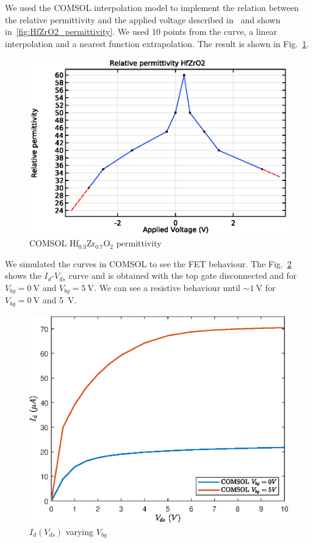 \documentclass[electronics,article,submit,moreauthors,pdftex]{Definitions/mdpi}
\begin{document}
We used the COMSOL interpolation model to implement the relation between the relative permittivity and the applied voltage described in~\cite{Dragoman:ferroelectric} and shown in~\ref{fig:HfZrO2_permittivity}. We used 10 points from the curve, a linear interpolation and a nearest function extrapolation. The result is shown in Fig.~\ref{fig:permittivity_HfZrO2}.

\begin{figure}[h]
	\centering
	\includegraphics[width=.7\textwidth]{Grafici/permittivity_HfZrO2.eps} 
	\caption{COMSOL Hf$_{0.3}$Zr$_{0.7}$O$_2$ permittivity}
	\label{fig:permittivity_HfZrO2}
\end{figure}

We simulated the curves in COMSOL to see the FET behaviour. The Fig.~\ref{fig:HfZrO2_Id(Vd)_varying_Vbg} shows the $I_d$-$V_{ds}$ curve and is obtained with the top gate disconnected and for $V_{bg} = \SI{0}{\volt}$ and $V_{bg} = \SI{5}{\volt}$. We can see a resistive behaviour until $\sim \SI{1}{\volt}$ for $V_{bg} = \SI{0}{\volt}$ and \SI{5}{\volt}.
\begin{figure}[h]
	\centering
	\includegraphics[width=.8\textwidth]{Grafici/HfZrO2_Id(Vd)_varying_Vbg.eps} 
	\caption{$I_d(V_{ds})$ varying $V_{bg}$}
	\label{fig:HfZrO2_Id(Vd)_varying_Vbg}
\end{figure} 
\end{document}
